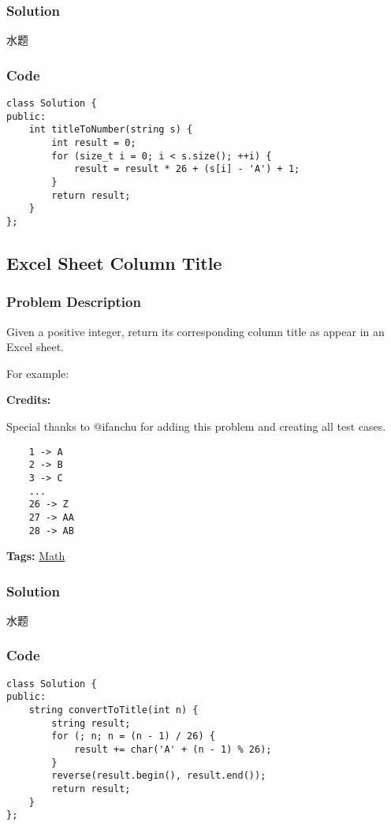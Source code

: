 \documentclass{article}
\begin{document}
\begin{CJK*}{UTF8}{gkai}
\subsubsection*{Solution}
水题

\subsubsection*{Code}
\begin{lstlisting}
class Solution {
public:
    int titleToNumber(string s) {
        int result = 0;
        for (size_t i = 0; i < s.size(); ++i) {
            result = result * 26 + (s[i] - 'A') + 1;
        }
        return result;
    }
}; 
\end{lstlisting}


\subsection{ Excel Sheet Column Title }
\label{ Excel Sheet Column Title }

\subsubsection*{Problem Description}
Given a positive integer, return its corresponding column title as appear in an Excel sheet.

For example:

\textbf{Credits:}

Special thanks to @ifanchu for adding this problem and creating all test cases.

\begin{verbatim}
    1 -> A
    2 -> B
    3 -> C
    ...
    26 -> Z
    27 -> AA
    28 -> AB 
\end{verbatim}

\textbf{Tags: }
\hyperref[ Math ]{ Math }



\subsubsection*{Solution}
水题

\subsubsection*{Code}
\begin{lstlisting}
class Solution {
public:
    string convertToTitle(int n) {
        string result;
        for (; n; n = (n - 1) / 26) {
            result += char('A' + (n - 1) % 26);
        }
        reverse(result.begin(), result.end());
        return result;
    }
}; 
\end{lstlisting}



\end{CJK*}
\end{document}
